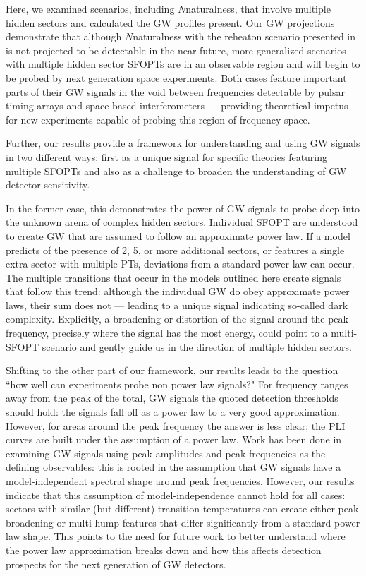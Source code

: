 \documentclass[nofootinbib,twocolumn,preprintnumbers]{revtex4-1}
\begin{document}
Here, we examined scenarios, including $N$naturalness, that involve multiple hidden sectors and calculated the GW profiles present. Our GW projections demonstrate that although $N$naturalness with the reheaton scenario presented in~\cite{Arkani-Hamed:2016rle} is not projected to be detectable in the near future, more generalized scenarios with multiple hidden sector SFOPTs are in an observable region and will begin to be probed by next generation space experiments. Both cases feature important parts of their GW signals in the void between frequencies detectable by pulsar timing arrays and space-based interferometers --- providing theoretical impetus for new experiments capable of probing this region of frequency space. 

Further, our results provide a framework for understanding and using GW signals in two different ways: first as a unique signal for specific theories featuring multiple SFOPTs and also as a challenge to broaden the understanding of GW detector sensitivity. 

In the former case, this demonstrates the power of GW signals to probe deep into the unknown arena of complex hidden sectors. Individual SFOPT are understood to create GW that are assumed to follow an approximate power law. If a model predicts of the presence of 2, 5, or more additional sectors, or features a single extra sector with multiple PTs, deviations from a standard power law can occur. The multiple transitions that occur in the models outlined here create signals that follow this trend: although the individual GW do obey approximate power laws, their sum does not --- leading to a unique signal indicating so-called dark complexity. Explicitly, a broadening or distortion of the signal around the peak frequency, precisely where the signal has the most energy, could point to a multi-SFOPT scenario and gently guide us in the direction of multiple hidden sectors. %

Shifting to the other part of our framework, our results leads to the question ``how well can experiments probe non power law signals?" For frequency ranges away from the peak of the total, GW signals the quoted detection thresholds should hold: the signals fall off as a power law to a very good approximation. However, for areas around the peak frequency the answer is less clear; the PLI curves are built under the assumption of a power law. Work has been done \cite{alanne2019fresh} in examining GW signals using peak amplitudes and peak frequencies as the defining observables: this is rooted in the assumption that GW signals have a model-independent spectral shape around peak frequencies. However, our results indicate that this assumption of model-independence cannot hold for all cases: sectors with similar (but different) transition temperatures can create either peak broadening or multi-hump features that differ significantly from a standard power law shape.  This points to the need for future work to better understand where the power law approximation breaks down and how this affects detection prospects for the next generation of GW detectors. 
\end{document}
